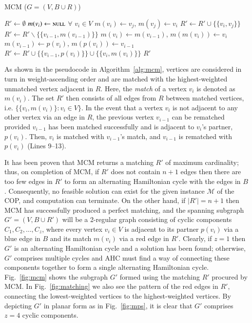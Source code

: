 \documentclass[a4paper,11pt,authoryear]{elsarticle}
\begin{document}
\begin{algorithm}[h]
\caption{MCM ($G = (V, B \cup R)$)}
\small
\begin{algorithmic}[1]
	\State $R' \gets \emptyset$
	\State $m(v_i) \gets \textsc{null}$ $\forall$ $v_i \in V$
				\State $m(v_i) \gets v_j$, $m(v_j) \gets v_i$
				\State $R' \gets R' \cup \{\{v_i, v_j\}\}$
				\Break
			\EndIf
		\EndFor
			\State $R' \gets R' \backslash \{\{v_{i-1}, m(v_{i-1})\}\}$
			\State $m(v_i) \gets m(v_{i-1})$, $m(m(v_i)) \gets v_i$
			\State $m(v_{i-1}) \gets p(v_i)$, $m(p(v_i)) \gets v_{i-1}$
			\State $R' \gets R' \cup \{\{v_{i-1}, p(v_i)\}\} \cup \{\{v_i, m(v_i)\}\}$
		\EndIf
	\EndFor
	\Return $R'$
\end{algorithmic}
\label{alg:mcm}	
\end{algorithm}

As shown in the pseudocode in Algorithm~\ref{alg:mcm}, vertices are considered in turn in weight-ascending order and are matched with the highest-weighted unmatched vertex adjacent in $R$. Here, the \emph{match} of a vertex $v_i$ is denoted as $m(v_i)$. The set $R'$ then consists of all edges from $R$ between matched vertices, i.e. $\{\{v_i, m(v_i)\} : v_i \in V \}$. In the event that a vertex $v_i$ is not adjacent to any other vertex via an edge in $R$, the previous vertex $v_{i-1}$ can be rematched provided $v_{i-1}$ has been matched successfully and is adjacent to $v_i$'s partner, $p(v_i)$. Then, $v_i$ is matched with $v_{i-1}$'s match, and $v_{i-1}$ is rematched with $p(v_i)$ (Lines 9--13).

It has been proven that MCM returns a matching $R'$ of maximum cardinality; thus, on completion of MCM, if $R'$ does not contain $n+1$ edges then there are too few edges in $R'$ to form an alternating Hamiltonian cycle with the edges in $B$ \citep{hawa2020t}. Consequently, no feasible solution can exist for the given instance $\mathcal{M}$ of the COP, and computation can terminate. On the other hand, if $|R'|=n+1$ then MCM has successfully produced a perfect matching, and the spanning subgraph $G'=(V, B \cup R')$ will be a 2-regular graph consisting of cyclic components $C_1, C_2,\dotsc,C_z$, where every vertex $v_i \in V$ is adjacent to its partner $p(v_i)$ via a blue edge in $B$ and its match $m(v_i)$ via a red edge in $R'$. Clearly, if $z=1$ then $G'$ is an alternating Hamiltonian cycle and a solution has been found; otherwise, $G'$ comprises multiple cycles and AHC must find a way of connecting these components together to form a single alternating Hamiltonian cycle. Fig.~\ref{fig:mcm} shows the subgraph $G'$ formed using the matching $R'$ procured by MCM. In Fig.~\ref{fig:matching} we also see the pattern of the red edges in $R'$, connecting the lowest-weighted vertices to the highest-weighted vertices. By depicting $G'$ in planar form as in Fig.~\ref{fig:mps}, it is clear that $G'$ comprises $z=4$ cyclic components.
\end{document}
